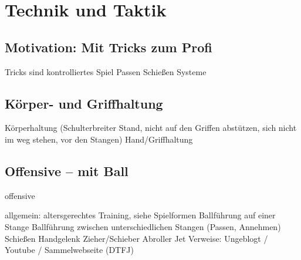 \chapter{Technik und Taktik}
\label{technik}

\section{Motivation: Mit Tricks zum Profi}
\label{technik:motivation}
Tricks sind kontrolliertes Spiel
Passen
Schießen
Systeme

\section{Körper- und Griffhaltung}
\label{technik:haltung}
Körperhaltung (Schulterbreiter Stand, nicht auf den Griffen abstützen, sich nicht im weg stehen, vor den Stangen)
Hand/Griffhaltung

\section{Offensive -- mit Ball}
\label{technik:offensive}


\gls{offensive}

allgemein: altersgerechtes Training, siehe Spielformen
Ballführung auf einer Stange
Ballführung zwischen unterschiedlichen Stangen (Passen, Annehmen)
Schießen
Handgelenk
Zieher/Schieber
Abroller
Jet
Verweise: Ungeblogt / Youtube / Sammelwebseite (DTFJ)


